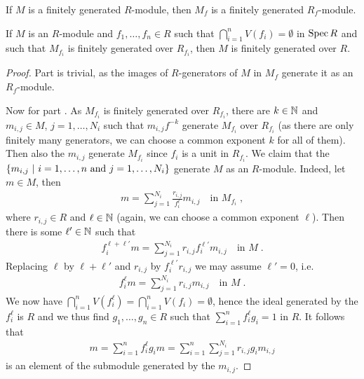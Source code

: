\documentclass[a4paper,parskip=half,numbers=enddot, DIV=12]{scrreprt}
\begin{document}
\begin{lem}
	\begin{alphanumerate}
		\item {}If $M$ is a finitely generated $R$-module, then $M_f$ is a finitely generated $R_f$-module.
		\item If $M$ is an $R$-module and $f_1,\ldots,f_n\in R$ such that $\bigcap_{i=1}^nV(f_i)=\emptyset$ in $\operatorname{Spec} R$ and such that $M_{f_i}$ is finitely generated over $R_{f_i}$, then $M$ is finitely generated over $R$.
	\end{alphanumerate}
\end{lem}
\begin{proof}
	Part  is trivial, as the images of $R$-generators of $M$ in $M_f$ generate it as an $R_f$-module.
	
	Now for part . As $M_{f_i}$ is finitely generated over $R_{f_i}$, there are $k\in\mathbb{N}$ and $m_{i,j}\in M$, $j=1,\ldots,N_i$ such that $m_{i,j}f^{-k}$ generate $M_{f_i}$ over $R_{f_i}$ (as there are only finitely many generators, we can choose a common exponent $k$ for all of them). Then also the $m_{i,j}$ generate $M_{f_i}$ since $f_i$ is a unit in $R_{f_i}$. We claim that the $\left\{m_{i,j}\ \middle|\  i=1,\ldots, n\text{ and }j=1,\ldots, N_i\right\}$ generate $M$ as an $R$-module. Indeed, let $m\in M$, then
	\begin{align*}
		m=\sum_{j=1}^{N_i}\frac{r_{i,j}}{f_i^\ell}m_{i,j}\quad\text{in }M_{f_i}\;,
	\end{align*}
	where $r_{i,j}\in R$ and $\ell\in\mathbb{N}$ (again, we can choose a common exponent $\ell$). Then there is some $\ell'\in \mathbb{N}$ such that
	\begin{align*}
		f_i^{\ell+\ell'}m=\sum_{j=1}^{N_i}r_{i,j}f_i^{\ell'}m_{i,j}\quad\text{in }M\;.
	\end{align*}
	Replacing $\ell$ by $\ell+\ell'$ and $r_{i,j}$ by $f_i^{\ell'}r_{i,j}$ we may assume $\ell'=0$, i.e.
	\begin{align*}
		f_i^{\ell}m=\sum_{j=1}^{N_i}r_{i,j}m_{i,j}\quad\text{in }M\;.
	\end{align*}
	We now have $\bigcap_{i=1}^nV(f_i^\ell)=\bigcap_{i=1}^nV(f_i)=\emptyset$, hence the ideal generated by the $f_i^\ell$ is $R$ and we thus find $g_1,\ldots,g_n\in R$ such that $\sum_{i=1}^{n}f_i^\ell g_i=1$ in $R$. It follows that
	\begin{align*}
		m=\sum_{i=1}^nf_i^\ell g_im=\sum_{i=1}^{n}\sum_{j=1}^{N_i}r_{i,j}g_im_{i,j}
	\end{align*}
	is an element of the submodule generated by the $m_{i,j}$.
\end{proof}
\end{document}
